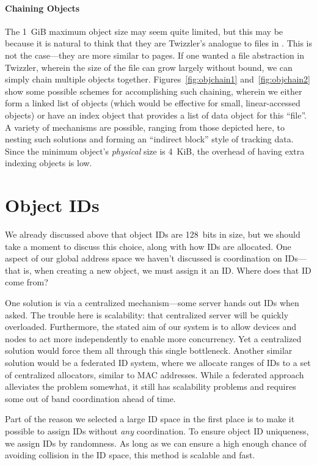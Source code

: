 \paragraph{Chaining Objects}
The 1~GiB maximum object size may seem quite limited, but this may be because it is natural to think that they are
Twizzler's analogue to files in \unix. This is not the case---they are more similar to pages. If one wanted a
file abstraction in Twizzler, wherein the size of the file can grow largely without bound, we can simply chain multiple
objects together. Figures~\ref{fig:objchain1} and~\ref{fig:objchain2} show some possible schemes for accomplishing such
chaining, wherein we either form a linked list of objects (which would be effective for small, linear-accessed objects)
or have an index object that provides a list of data object for this ``file''. A variety of mechanisms are possible,
ranging from those depicted here, to nesting such solutions and forming an ``indirect block'' style of tracking data.
Since the minimum object's \emph{physical} size is 4~KiB, the overhead of having extra indexing objects is low.



\section{Object IDs}

We already discussed above that object IDs are 128~bits in size, but we should take a moment to discuss this choice,
along with how IDs are allocated. One aspect of our global address space we haven't discussed is coordination on IDs---that is,
when creating a new object, we must assign it an ID. Where does that ID come from?

One solution is via a centralized mechanism---some server hands out IDs when asked. The trouble here is scalability:
that centralized server will be quickly overloaded. Furthermore, the stated aim of our system is to allow devices and
nodes to act more independently to enable more concurrency. Yet a centralized solution would force them all through this
single bottleneck. Another similar solution would be a federated ID system, where we allocate ranges of IDs to a set of
centralized allocators, similar to MAC addresses. While a federated approach alleviates the problem somewhat, it still
has scalability problems and requires some out of band coordination ahead of time.

Part of the reason we selected a large ID space in the first place is to make it possible to assign IDs without
\emph{any} coordination. To ensure object ID uniqueness, we assign IDs by randomness. As long as we can ensure a high
enough chance of avoiding collision in the ID space, this method is scalable and fast.

